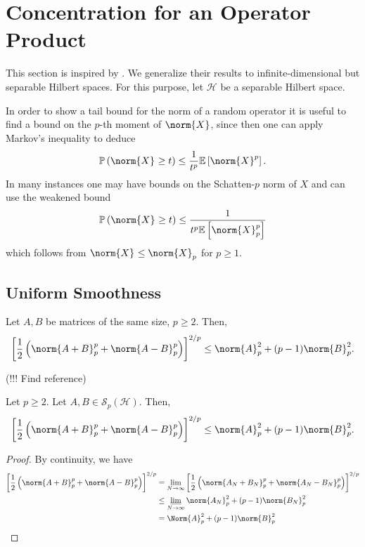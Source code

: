 \newpage

\section{Concentration for an Operator Product}

This section is inspired by \cite{huang2020matrix}. We generalize their results to infinite-dimensional but separable Hilbert spaces. For this purpose, let \( \mathcal{H} \) be a separable Hilbert space.

In order to show a tail bound for the norm of a random operator it is useful to find a bound on the \( p \)-th moment of \( \norm{X}_{} \), since then one can apply Markov's inequality to deduce 
\[ \mathbb{P}\left(\norm{X}_{} \geq t \right) \leq \frac{1}{t^{p}} \mathbb{E}\left[\norm{X}_{}^{p}\right]. \]
In many instances one may have bounds on the Schatten-\( p \) norm of \( X \) and can use the weakened bound 
\[ \mathbb{P}\left(\norm{X}_{} \geq t\right) \leq \frac{1}{t^{p} \mathbb{E}\left[\norm{X}_{p}^{p}\right]} \]
which follows from \( \norm{X}_{} \leq \norm{X}_{p} \) for \( p \geq 1 \).


\begin{defn}
    
\end{defn}


\subsection{Uniform Smoothness}


\begin{lem}
  Let \( A,B \) be matrices of the same size, \( p \geq 2\). Then,
    \[ \left[\frac{1}{2} \left( \norm{A+B}_{p}^{p}+ \norm{A-B}_{p}^{p}\right)\right]^{2/p} \leq  \norm{A}_{p}^{2}+ (p-1) \norm{B}_{p}^{2}. \]
\end{lem}
(!!! Find reference)

\begin{corl}
    Let \( p \geq 2 \). Let \( A,B \in \mathcal{S}_p(\mathcal{H}) \). Then,
    \[ \left[\frac{1}{2} \left( \norm{A+B}_{p}^{p}+ \norm{A-B}_{p}^{p}\right)\right]^{2/p} \leq  \norm{A}_{p}^{2}+ (p-1) \norm{B}_{p}^{2}. \]
\end{corl}

\begin{proof}
   By continuity, we have
   \begin{align*}
     \left[\frac{1}{2} \left(\norm{A+B}_{p}^{p}+ \norm{A-B}_{p}^{p}\right)\right]^{2/p} &= \lim_{N \to \infty} \left[\frac{1}{2} \left(\norm{A_N+B_N}_{p}^{p}+\norm{A_N-B_N}_{p}^{p}\right)\right]^{2/p} \\
                                                                                        & \leq \varliminf_{N \to \infty} \norm{A_N}_{p}^{2} + (p-1)\norm{B_N}_{p}^{2} \\
                                                                                        & = \Norm{A}_{p}^{2} + (p-1) \norm{B}_{p}^{2}
   \end{align*}
\end{proof}

